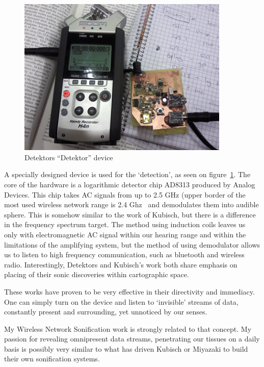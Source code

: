 \documentclass[12pt,a4paper,oneside]{report}
\begin{document}
\begin{figure}  
  \centering
    \includegraphics[width=0.9\textwidth]{img/detektor}
	\caption{Detektors ``Detektor'' device}
	\label{fig:detektor}
\end{figure}

A specially designed device is used for the `detection', as seen on figure~\ref{fig:detektor}. The core of the hardware is a logarithmic detector chip AD8313 produced by Analog Devices. This chip takes AC signals from up to 2.5 GHz  (upper border of the most used wireless network range is 2.4 Ghz~\cite{802} and demodulates them into audible sphere. This is somehow similar to the work of Kubisch, but there is a difference in the frequency spectrum target. The method using induction coils leaves us only with electromagnetic AC signal within our hearing range and within the limitations of the amplifying system, but the method of using demodulator allows us to listen to high frequency communication, such as bluetooth and wireless radio. Interestingly, Detektors and Kubisch's work both share emphasis on placing of their sonic discoveries within cartographic space.

These works have proven to be very effective in their directivity and immediacy. One can simply turn on the device and listen to `invisible' streams of data, constantly present and surrounding, yet unnoticed by our senses. 

My Wireless Network Sonification work is strongly related to that concept. My passion for revealing omnipresent data streams, penetrating our tissues on a daily basis is possibly very similar to what has driven Kubisch or Miyazaki to build their own sonification systems.  
\end{document}
